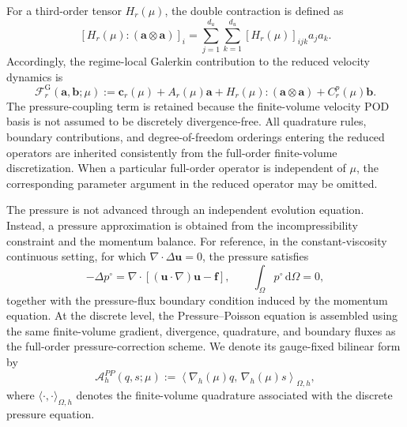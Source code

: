 For a third-order tensor $H_r(\mu)$, the double contraction is defined as
\begin{equation}
  \left[
    H_r(\mu):
    (\boldsymbol{a}\otimes\boldsymbol{a})
  \right]_i
  =
  \sum_{j=1}^{d_u}
  \sum_{k=1}^{d_u}
  [H_r(\mu)]_{ijk}a_j a_k.
  \label{eq:galerkin_tensor_contraction}
\end{equation}
Accordingly, the regime-local Galerkin contribution to the reduced velocity
dynamics is
\begin{equation}
  \mathscr{F}^{\mathrm{G}}_r
  (\boldsymbol{a},\boldsymbol{b};\mu)
  :=
  \boldsymbol{c}_r(\mu)
  +A_r(\mu)\boldsymbol{a}
  +H_r(\mu):
   (\boldsymbol{a}\otimes\boldsymbol{a})
  +C_r^p(\mu)\boldsymbol{b}.
  \label{eq:chart_local_galerkin_rhs_definition}
\end{equation}
The pressure-coupling term is retained because the finite-volume velocity
POD basis is not assumed to be discretely divergence-free.  All quadrature
rules, boundary contributions, and degree-of-freedom orderings entering the
reduced operators are inherited consistently from the full-order
finite-volume discretization.  When a particular full-order operator is
independent of $\mu$, the corresponding parameter argument in the reduced
operator may be omitted.

The pressure is not advanced through an independent evolution equation.
Instead, a pressure approximation is obtained from the incompressibility
constraint and the momentum balance.  For reference, in the
constant-viscosity continuous setting, for which
$\nabla\cdot\Delta\boldsymbol{u}=0$, the pressure satisfies
\begin{equation}
  -\Delta p^{\circ}
  =
  \nabla\cdot
  \left[
    (\boldsymbol{u}\cdot\nabla)\boldsymbol{u}
    -\boldsymbol{f}
  \right],
  \qquad
  \int_{\Omega}p^{\circ}\,\mathrm{d}\Omega=0,
  \label{eq:pressure_poisson_strong_form}
\end{equation}
together with the pressure-flux boundary condition induced by the momentum
equation.  At the discrete level, the Pressure--Poisson equation is assembled
using the same finite-volume gradient, divergence, quadrature, and boundary
fluxes as the full-order pressure-correction scheme.  We denote its
gauge-fixed bilinear form by
\begin{equation}
  \mathscr{A}^{PP}_h(q,s;\mu)
  :=
  \left\langle
    \nabla_h(\mu)q,\,
    \nabla_h(\mu)s
  \right\rangle_{\Omega,h},
  \label{eq:pressure_poisson_bilinear_form}
\end{equation}
where $\langle\cdot,\cdot\rangle_{\Omega,h}$ denotes the finite-volume
quadrature associated with the discrete pressure equation.

